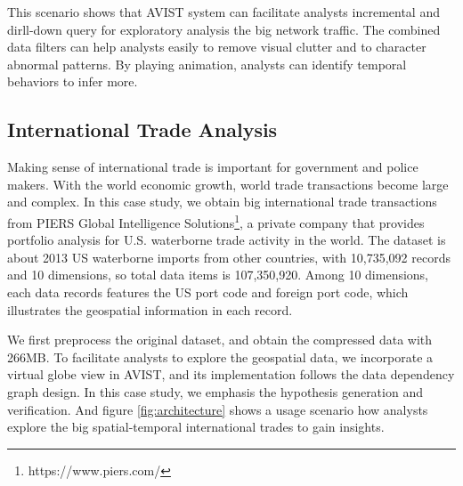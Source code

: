 \documentclass[journal]{vgtc}                %
\begin{document}
{%



This scenario shows that AVIST system can facilitate analysts incremental and dirll-down query for exploratory analysis the big network traffic. The combined data filters can help analysts easily to remove visual clutter and to character abnormal patterns. By playing animation, analysts can identify temporal behaviors to infer more. 
 

 



\subsection{International Trade Analysis}
Making sense of international trade is important for government and police makers. With the world economic growth, world trade transactions become large and complex. In this case study, we obtain big international trade transactions from PIERS Global Intelligence Solutions\footnote{https://www.piers.com/}, a private company that provides portfolio analysis for U.S. waterborne trade activity in the world. The dataset is about 2013 US waterborne imports from other countries, with 10,735,092 records and 10 dimensions, so total data items is 107,350,920. Among 10 dimensions, each data records features the US port code and foreign port code, which illustrates the geospatial information in each record.

We first preprocess the original dataset, and obtain the compressed data with 266MB. To facilitate analysts to explore the geospatial data, we incorporate a virtual globe view in AVIST, and its implementation follows the data dependency graph design. In this case study, we emphasis the hypothesis generation and verification.
And figure \ref{fig:architecture} shows a usage scenario how analysts explore the big spatial-temporal international trades to gain insights.

}
\end{document}
